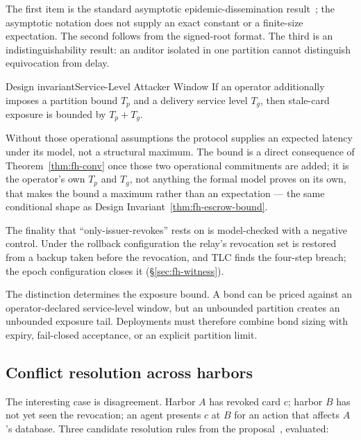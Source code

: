 \documentclass[11pt,a4paper]{article}
\theoremstyle{definition}
\theoremstyle{remark}
\begin{document}
The first item is the standard asymptotic epidemic-dissemination result~; the asymptotic notation does not supply an exact constant or a finite-size expectation. The second follows from the signed-root format. The third is an indistinguishability result: an auditor isolated in one partition cannot distinguish equivocation from delay.

\begin{pdclaim}{Design invariant}{Service-Level Attacker Window}
\setlength{\parskip}{4pt plus 1pt}
\label{cor:fh-window}
If an operator additionally imposes a partition bound $T_p$ and a delivery service level $T_g$, then stale-card exposure is bounded by $T_p+T_g$. 

Without those operational assumptions the protocol supplies an expected latency under its model, not a structural maximum. The bound is a direct consequence of Theorem~\ref{thm:fh-conv} once those two operational commitments are added; it is the operator's own $T_p$ and $T_g$, not anything the formal model proves on its own, that makes the bound a maximum rather than an expectation --- the same conditional shape as Design Invariant~\ref{thm:fh-escrow-bound}.
\end{pdclaim}



The finality that ``only-issuer-revokes'' rests on is model-checked with a negative
control. Under the rollback configuration the relay's revocation set is restored from a
backup taken before the revocation, and TLC finds the four-step breach; the epoch
configuration closes it (\S\ref{sec:fh-witness}).



The distinction determines the exposure bound. A bond can be priced against an operator-declared service-level window, but an unbounded partition creates an unbounded exposure tail. Deployments must therefore combine bond sizing with expiry, fail-closed acceptance, or an explicit partition limit.

\subsection{Conflict resolution across harbors}\label{sec:fh-revocation-conflict}

The interesting case is disagreement. Harbor $A$ has revoked card $c$; harbor $B$ has not yet seen the revocation; an agent presents $c$ at $B$ for an action that affects $A$'s database. Three candidate resolution rules from the proposal~, evaluated:
\end{document}
